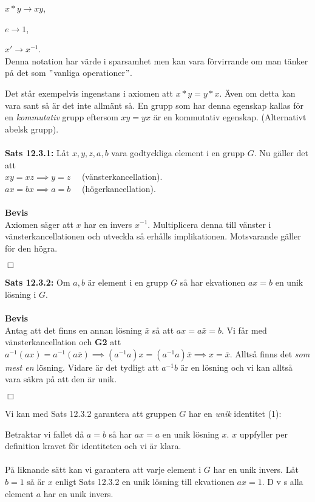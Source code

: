 \documentclass{article}
\begin{document}
$x*y\longrightarrow xy$,

$e\longrightarrow 1$,

$x'\longrightarrow x^{-1}$.\\
Denna notation har värde i sparsamhet men kan vara förvirrande om man tänker på det som $"$vanliga operationer$"$.

Det står exempelvis ingenstans i axiomen att $x*y=y*x$. Även om detta kan vara sant så är det inte allmänt så. En grupp som har denna egenskap kallas för en \textit{kommutativ} grupp eftersom $xy=yx$ är en kommutativ egenskap. (Alternativt abelsk grupp).\\ \\ 
\textbf{Sats 12.3.1:} Låt $x,y,z,a,b$ vara godtyckliga element i en grupp $G$. Nu gäller det att\\ 

$xy=xz\implies y=z \quad$ (vänsterkancellation).\\ 

$ax=bx\implies a=b \quad$ (högerkancellation).\\ \\ 
\textbf{Bevis}\\ 
Axiomen säger att $x$ har en invers $x^{-1}$. Multiplicera denna till vänster i vänsterkancellationen och utveckla så erhålls implikationen. Motsvarande gäller för den högra.
\begin{flushright}
$\Box$
\end{flushright}
\textbf{Sats 12.3.2:} Om $a,b$ är element i en grupp $G$ så har ekvationen $ax=b$ en unik lösning i $G$.\\ \\ 
\textbf{Bevis}\\ 
Antag att det finns en annan lösning $\bar{x}$ så att $ax=a\bar{x}=b$. Vi får med vänsterkancellation och \textbf{G2} att $a^{-1}(ax)=a^{-1}(a\bar{x})\implies(a^{-1}a)x=(a^{-1}a)\bar{x}\implies x=\bar{x}$. Alltså finns det \textit{som mest en} lösning. Vidare är det tydligt att $a^{-1}b$ är en lösning och vi kan alltså vara säkra på att den är unik.
\begin{flushright}
$\Box$
\end{flushright}
Vi kan med Sats 12.3.2 garantera att gruppen $G$ har en \textit{unik} identitet (1):

Betraktar vi fallet då $a=b$ så har $ax=a$ en unik lösning $x$. $x$ uppfyller per definition kravet för identiteten och vi är klara.\\ \\ 
På liknande sätt kan vi garantera att varje element i $G$ har en unik invers. Låt $b=1$ så är $x$ enligt Sats 12.3.2 en unik lösning till ekvationen $ax=1$. D v s alla element $a$ har en unik invers.
\end{document}
